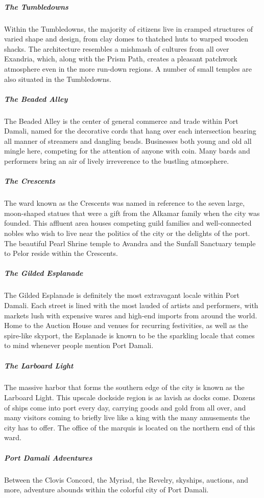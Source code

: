 \documentclass[10pt,a4paper,twoside,bg=print,twocolumn,openany,nodeprecatedcode]{dndbook}
\begin{document}
\subparagraph{The Tumbledowns}
Within the Tumbledowns, the majority of citizens live in cramped structures of varied shape and design, from clay domes to thatched huts to warped wooden shacks. The architecture resembles a mishmash of cultures from all over Exandria, which, along with the Prism Path, creates a pleasant patchwork atmosphere even in the more run-down regions. A number of small temples are also situated in the Tumbledowns.

\subparagraph{The Beaded Alley}
The Beaded Alley is the center of general commerce and trade within Port Damali, named for the decorative cords that hang over each intersection bearing all manner of streamers and dangling beads. Businesses both young and old all mingle here, competing for the attention of anyone with coin. Many bards and performers bring an air of lively irreverence to the bustling atmosphere.

\subparagraph{The Crescents}
The ward known as the Crescents was named in reference to the seven large, moon-shaped statues that were a gift from the Alkamar family when the city was founded. This affluent area houses competing guild families and well-connected nobles who wish to live near the politics of the city or the delights of the port. The beautiful Pearl Shrine temple to Avandra and the Sunfall Sanctuary temple to Pelor reside within the Crescents.

\subparagraph{The Gilded Esplanade}
The Gilded Esplanade is definitely the most extravagant locale within Port Damali. Each street is lined with the most lauded of artists and performers, with markets lush with expensive wares and high-end imports from around the world. Home to the Auction House and venues for recurring festivities, as well as the spire-like skyport, the Esplanade is known to be the sparkling locale that comes to mind whenever people mention Port Damali.

\subparagraph{The Larboard Light}
The massive harbor that forms the southern edge of the city is known as the Larboard Light. This upscale dockside region is as lavish as docks come. Dozens of ships come into port every day, carrying goods and gold from all over, and many visitors coming to briefly live like a king with the many amusements the city has to offer. The office of the marquis is located on the northern end of this ward.

\subparagraph{Port Damali Adventures}
Between the Clovis Concord, the Myriad, the Revelry, skyships, auctions, and more, adventure abounds within the colorful city of Port Damali.
\end{document}
